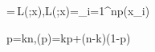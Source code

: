 \widehat\theta=\underset{}\,L(\theta;x),\qquad L(\theta;x)=\prod_{i=1}^np(x_i\mid\theta)

\widehat p=\frac kn,\qquad \ell(p)=k\ln p+(n-k)\ln(1-p)
